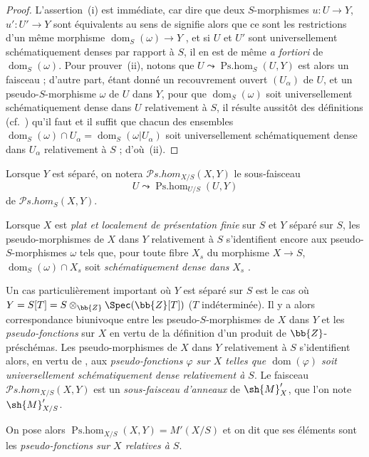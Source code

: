 \begin{proof}
L'assertion~(i) est immédiate, car dire que deux $S$-morphismes $u:U\to Y$, $u':U'\to Y$ sont équivalents au sens de  signifie alors que ce sont les restrictions d'un même morphisme $\operatorname{dom}_S(\omega)\to Y$ , et si $U$ et $U'$ sont universellement schématiquement denses par rapport à $S$, il en est de même \emph{a fortiori} de $\operatorname{dom}_S(\omega)$.
Pour prouver~(ii), notons que $U\leadsto\operatorname{Ps.hom}_S(U,Y)$ est alors un faisceau  ; d'autre part, étant donné un recouvrement ouvert $(U_\alpha)$ de $U$, et un pseudo-$S$-morphisme $\omega$ de $U$ dans $Y$, pour que $\operatorname{dom}_S(\omega)$ soit universellement schématiquement dense dans $U$ relativement à $S$, il résulte aussitôt des définitions (cf.\ ) qu'il faut et il suffit que chacun des ensembles $\operatorname{dom}_S(\omega)\cap U_\alpha=\operatorname{dom}_S(\omega|U_\alpha)$ soit universellement schématiquement dense dans $U_\alpha$ relativement à $S$ ; d'où~(ii).
\end{proof}

Lorsque $Y$ est séparé, on notera $\mathscr{P}\!s.\mathit{hom}_{X/S}(X,Y)$ le sous-faisceau
\[
  U\leadsto\operatorname{Ps.hom}_{U/S}(U,Y)
\]
de $\mathscr{P}\!s.\mathit{hom}_S(X,Y)$.

Lorsque $X$ est \emph{plat et localement de présentation finie} sur $S$ et $Y$ séparé sur $S$, les pseudo-morphismes de $X$ dans $Y$ relativement à $S$ s'identifient encore aux pseudo-$S$-morphismes $\omega$ tels que, pour toute fibre $X_s$ du morphisme $X\to S$, $\operatorname{dom}_S(\omega)\cap X_s$ soit \emph{schématiquement dense dans} $X_s$ .

\begin{env}[20.5.4]
Un cas particulièrement important où $Y$ est séparé sur $S$ est le cas où $Y=S[T]=S\otimes_{\bb{Z}}\Spec(\bb{Z}[T])$ ($T$ indéterminée).
Il y a alors correspondance biunivoque entre les pseudo-$S$-morphismes de $X$ dans $Y$ et les \emph{pseudo-fonctions} sur $X$  en vertu de la définition d'un produit de $\bb{Z}$-préschémas.
Les pseudo-morphismes de $X$ dans $Y$ relativement à $S$ s'identifient alors, en vertu de , aux \emph{pseudo-fonctions $\varphi$ sur $X$ telles que $\operatorname{dom}(\varphi)$ soit universellement schématiquement dense relativement à $S$}.
Le faisceau $\mathscr{P}\!s.\mathit{hom}_{X/S}(X,Y)$ est un \emph{sous-faisceau d'anneaux} de $\sh{M}'_X$, que l'on note $\sh{M}'_{X/S}$.

On pose alors $\operatorname{Ps.hom}_{X/S}(X,Y)=M'(X/S)$ et on dit que ses éléments sont les \emph{pseudo-fonctions sur $X$ relatives à $S$}.
\end{env}


